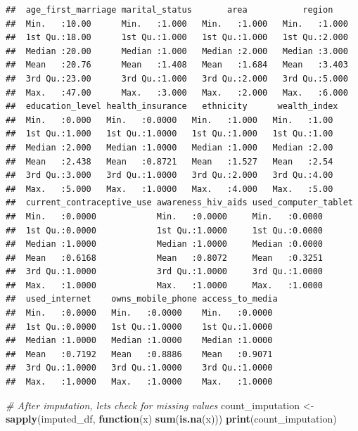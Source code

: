 \documentclass[
]{article}
\newenvironment{Shaded}{\begin{snugshade}}{\end{snugshade}}
\newcommand{\CommentTok}[1]{\textcolor[rgb]{0.56,0.35,0.01}{\textit{#1}}}
\newcommand{\ControlFlowTok}[1]{\textcolor[rgb]{0.13,0.29,0.53}{\textbf{#1}}}
\newcommand{\FunctionTok}[1]{\textcolor[rgb]{0.13,0.29,0.53}{\textbf{#1}}}
\newcommand{\NormalTok}[1]{#1}
\newcommand{\OtherTok}[1]{\textcolor[rgb]{0.56,0.35,0.01}{#1}}
\begin{document}
\begin{verbatim}
##  age_first_marriage marital_status       area           region     
##  Min.   :10.00      Min.   :1.000   Min.   :1.000   Min.   :1.000  
##  1st Qu.:18.00      1st Qu.:1.000   1st Qu.:1.000   1st Qu.:2.000  
##  Median :20.00      Median :1.000   Median :2.000   Median :3.000  
##  Mean   :20.76      Mean   :1.408   Mean   :1.684   Mean   :3.403  
##  3rd Qu.:23.00      3rd Qu.:1.000   3rd Qu.:2.000   3rd Qu.:5.000  
##  Max.   :47.00      Max.   :3.000   Max.   :2.000   Max.   :6.000  
##  education_level health_insurance   ethnicity      wealth_index 
##  Min.   :0.000   Min.   :0.0000   Min.   :1.000   Min.   :1.00  
##  1st Qu.:1.000   1st Qu.:1.0000   1st Qu.:1.000   1st Qu.:1.00  
##  Median :2.000   Median :1.0000   Median :1.000   Median :2.00  
##  Mean   :2.438   Mean   :0.8721   Mean   :1.527   Mean   :2.54  
##  3rd Qu.:3.000   3rd Qu.:1.0000   3rd Qu.:2.000   3rd Qu.:4.00  
##  Max.   :5.000   Max.   :1.0000   Max.   :4.000   Max.   :5.00  
##  current_contraceptive_use awareness_hiv_aids used_computer_tablet
##  Min.   :0.0000            Min.   :0.0000     Min.   :0.0000      
##  1st Qu.:0.0000            1st Qu.:1.0000     1st Qu.:0.0000      
##  Median :1.0000            Median :1.0000     Median :0.0000      
##  Mean   :0.6168            Mean   :0.8072     Mean   :0.3251      
##  3rd Qu.:1.0000            3rd Qu.:1.0000     3rd Qu.:1.0000      
##  Max.   :1.0000            Max.   :1.0000     Max.   :1.0000      
##  used_internet    owns_mobile_phone access_to_media 
##  Min.   :0.0000   Min.   :0.0000    Min.   :0.0000  
##  1st Qu.:0.0000   1st Qu.:1.0000    1st Qu.:1.0000  
##  Median :1.0000   Median :1.0000    Median :1.0000  
##  Mean   :0.7192   Mean   :0.8886    Mean   :0.9071  
##  3rd Qu.:1.0000   3rd Qu.:1.0000    3rd Qu.:1.0000  
##  Max.   :1.0000   Max.   :1.0000    Max.   :1.0000
\end{verbatim}

\begin{Shaded}
\begin{Highlighting}[]
\CommentTok{\# After imputation, let\textquotesingle{}s check for missing values}
\NormalTok{count\_imputation }\OtherTok{\textless{}{-}} \FunctionTok{sapply}\NormalTok{(imputed\_df, }\ControlFlowTok{function}\NormalTok{(x) }\FunctionTok{sum}\NormalTok{(}\FunctionTok{is.na}\NormalTok{(x)))}
\FunctionTok{print}\NormalTok{(count\_imputation)}
\end{Highlighting}
\end{Shaded}
\end{document}
